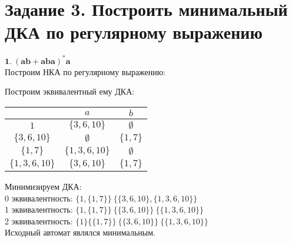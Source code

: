 \documentclass[12pt]{article}
\begin{document}
	\section*{Задание 3. Построить минимальный ДКА по регулярному выражению}
	$\boldsymbol{1.\ (ab+aba)^*a}$ \\
	Построим НКА по регулярному выражению: 
	\begin{center}
	\end{center}
	Построим эквивалентный ему ДКА: 
	\begin{center}
		\begin{tabular}{|c|c|c|}
		\hline
		$\ $ & $a$ & $b$ \\
		\hline
		$1$ & $\{3,6,10\}$ & $\emptyset$ \\
		\hline
		$\{3,6,10\}$ & $\emptyset$ & $\{1,7\}$ \\
		\hline
		$\{1,7\}$ & $\{1,3,6,10\}$ & $\emptyset$ \\
		\hline
		$\{1,3,6,10\}$ & $\{3,6,10\}$ & $\{1,7\}$ \\
		\hline
		\end{tabular}
		
	\end{center}
	Минимизируем ДКА: \\
	0 эквивалентность: $\{1,\{1,7\}\}\ \{\{3,6,10\},\{1,3,6,10\}\}$ \\
	1 эквивалентность: $\{1,\{1,7\}\}\ \{\{3,6,10\}\}\ \{\{1,3,6,10\}\}$ \\
	2 эквивалентность: $\{1\}\{\{1,7\}\}\ \{\{3,6,10\}\}\ \{\{1,3,6,10\}\}$ \\
	
	Исходный автомат являлся минимальным. \\
	
\end{document}
